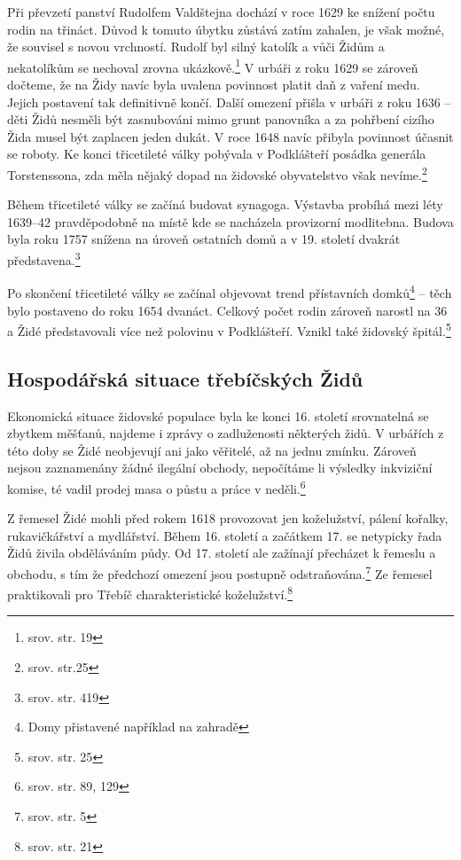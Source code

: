 \documentclass[a4paper,oneside,12pt]{report}
\begin{document}
Při převzetí panství Rudolfem Valdštejna dochází v roce 1629 ke snížení počtu rodin na třináct.
Důvod k tomuto úbytku zůstává zatím zahalen, je však možné, že souvisel s novou vrchností.
Rudolf byl silný katolík a vůči Židům a nekatolíkům se nechoval zrovna ukázkově.\footnote{srov.  str. 19}
V urbáři z roku 1629 se zároveň dočteme, že na Židy navíc byla uvalena povinnost platit daň z vaření medu.
Jejich  postavení tak definitivně končí.
Další omezení přišla v urbáři z roku 1636 -- děti Židů nesměli být zasnubováni mimo grunt panovníka a za pohřbení cizího Žida musel být zaplacen jeden dukát.
V roce 1648 navíc přibyla povinnost účasnit se roboty.
Ke konci třicetileté války pobývala v Podklášteří posádka generála Torstenssona, zda měla nějaký dopad na židovské obyvatelstvo však nevíme.\footnote{srov. \cite{Fiser2005} str.25}

Během třicetileté války se začíná budovat  synagoga.
Výstavba probíhá mezi léty 1639--42 pravděpodobně na místě kde se nacházela provizorní modlitebna.
Budova byla roku 1757 snížena na úroveň ostatních domů a v 19. století dvakrát představena.\footnote{srov. \cite{Pekny2001} str. 419}

Po skončení třicetileté války se začínal objevovat trend přístavních domků\footnote{Domy přistavené například na zahradě} -- těch bylo postaveno do roku 1654 dvanáct.
Celkový počet rodin zároveň narostl na 36 a Židé představovali více než polovinu v Podklášteří.
Vznikl také židovský špitál.\footnote{srov. \cite{Fiser2005} str. 25}

\subsection{Hospodářská situace třebíčských Židů}

Ekonomická situace židovské populace byla ke konci 16. století srovnatelná se zbytkem měšťanů, najdeme i zprávy o zadluženosti některých židů.
V urbářích z této doby se Židé neobjevují ani jako věřitelé, až na jednu zmínku.
Zároveň nejsou zaznamenány žádné ilegální obchody, nepočítáme li výsledky inkviziční komise, té vadil prodej masa o půstu a práce v neděli.\footnote{srov. \cite{Uhlir1978} str. 89, 129}

Z řemesel Židé mohli před rokem 1618 provozovat jen koželužství, pálení kořalky, rukavičkářství a mydlářství.
Během 16. století a začátkem 17. se netypicky řada Židů živila obděláváním půdy.
Od 17. století ale zažínají přecházet k řemeslu a obchodu, s tím že předchozí omezení jsou postupně odstraňována.\footnote{srov. \cite{Klenovsky2003} str. 5}
Ze řemesel praktikovali pro Třebíč charakteristické koželužství.\footnote{srov.  str. 21}
\end{document}

